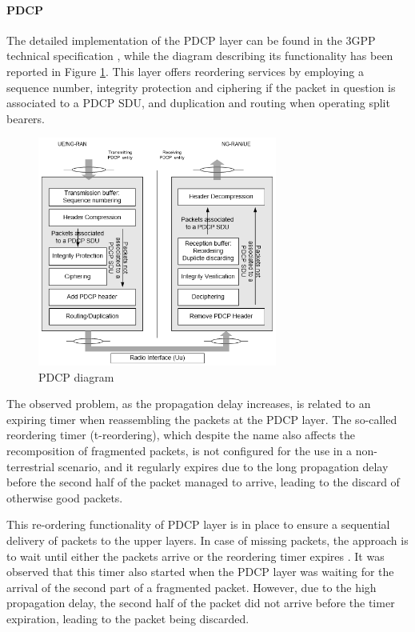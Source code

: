 \paragraph{PDCP}
The detailed implementation of the \ac{PDCP} layer can be found in the \ac{3GPP} technical specification \cite{pdcp-spec-3gpp}, while the diagram describing its functionality has been reported in Figure \ref{fig:pdcp-functionalities}. This layer offers reordering services by employing a sequence number, integrity protection and ciphering if the packet in question is associated to a \ac{PDCP} \ac{SDU}, and duplication and routing when operating split bearers.

\begin{figure}[ht]
    \centering
    \includegraphics[width=0.7\textwidth]{res/pdcp-functionality.png}
    \caption{PDCP diagram \cite{pdcp-spec-3gpp}}
    \label{fig:pdcp-functionalities}
\end{figure}

The observed problem, as the propagation delay increases, is related to an expiring timer when reassembling the packets at the \ac{PDCP} layer. The so-called reordering timer (t-reordering), which despite the name also affects the recomposition of fragmented packets, is not configured for the use in a non-terrestrial scenario, and it regularly expires due to the long propagation delay before the second half of the packet managed to arrive, leading to the discard of otherwise good packets.

This re-ordering functionality of \ac{PDCP} layer is in place to ensure a sequential delivery of packets to the upper layers. In case of missing packets, the approach is to wait until either the packets arrive or the reordering timer expires \cite{efficient-reassembly-pdcp}. It was observed that this timer also started when the \ac{PDCP} layer was waiting for the arrival of the second part of a fragmented packet. However, due to the high propagation delay, the second half of the packet did not arrive before the timer expiration, leading to the packet being discarded.

